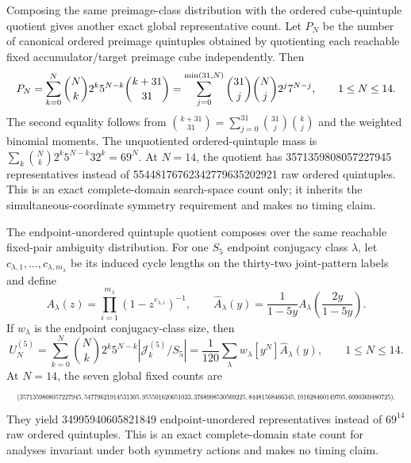 \documentclass{article}
\newcommand{\fitmath}[1]{\resizebox{0.99\linewidth}{!}{$\displaystyle #1$}}
\begin{document}
Composing the same preimage-class distribution with the ordered cube-quintuple
quotient gives another exact global representative count. Let $P_N$ be the
number of canonical ordered preimage quintuples obtained by quotienting each
reachable fixed accumulator/target preimage cube independently. Then
\begin{equation}
  \fitmath{%
    P_N
      =\sum_{k=0}^{N}\binom{N}{k}2^k5^{N-k}\binom{k+31}{31}
      =\sum_{j=0}^{\min(31,N)}
        \binom{31}{j}\binom{N}{j}2^j7^{N-j},
    \qquad 1\leq N\leq14.
  }
  \label{eq:optimization-crazy-global-ordered-preimage-quintuple-quotient}
\end{equation}
The second equality follows from
$\binom{k+31}{31}=\sum_{j=0}^{31}\binom{31}{j}\binom{k}{j}$ and the weighted
binomial moments. The unquotiented ordered-quintuple mass is
$\sum_k\binom{N}{k}2^k5^{N-k}32^k=69^N$. At $N=14$, the quotient has
3571359808057227945 representatives instead of 55448176762342779635202921
raw ordered quintuples. This is an exact complete-domain search-space count
only; it inherits the simultaneous-coordinate symmetry requirement and makes
no timing claim.

The endpoint-unordered quintuple quotient composes over the same reachable
fixed-pair ambiguity distribution. For one $S_5$ endpoint conjugacy class
$\lambda$, let $c_{\lambda,1},\ldots,c_{\lambda,m_\lambda}$ be its induced
cycle lengths on the thirty-two joint-pattern labels and define
\[
  A_\lambda(z)=\prod_{i=1}^{m_\lambda}
    (1-z^{c_{\lambda,i}})^{-1},\qquad
  \widehat A_\lambda(y)=\frac{1}{1-5y}
    A_\lambda\!\left(\frac{2y}{1-5y}\right).
\]
If $w_\lambda$ is the endpoint conjugacy-class size, then
\begin{equation}
  U^{(5)}_N
    =\sum_{k=0}^{N}\binom{N}{k}2^k5^{N-k}
      \left|\mathcal{J}^{(5)}_k/S_5\right|
    =\frac{1}{120}\sum_\lambda w_\lambda
      [y^N]\widehat A_\lambda(y),
  \qquad 1\leq N\leq14.
  \label{eq:optimization-crazy-global-unordered-preimage-quintuple-quotient}
\end{equation}
At $N=14$, the seven global fixed counts are
\begin{equation*}
  \fitmath{%
    (3571359808057227945,54779621914531305,955501620651033,
    3768908530569225,84481568466345,101628460149705,6090369480725).
  }
\end{equation*}
They yield 34995940605821849 endpoint-unordered representatives instead of
$69^{14}$ raw ordered quintuples. This is an exact complete-domain state count
for analyses invariant under both symmetry actions and makes no timing claim.
\end{document}
